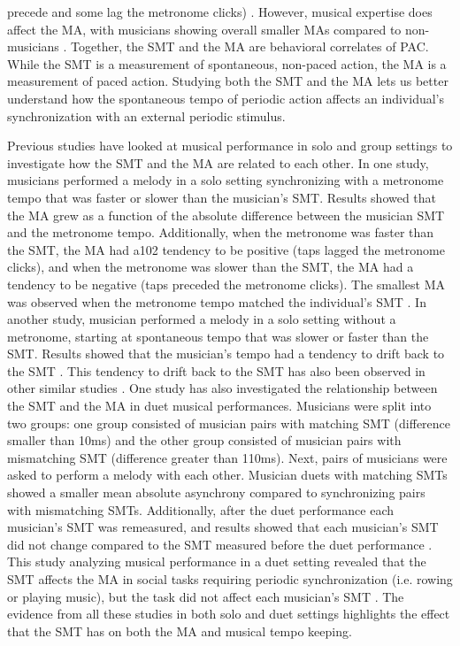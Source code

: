 \documentclass{report}
\begin{document}
precede and some lag the metronome clicks) \cite{baaaath2016estimating}. However, musical expertise does affect the MA, with musicians showing overall smaller MAs compared to non-musicians \cite{repp2007tapping}. Together, the SMT and the MA are behavioral correlates of PAC. While the SMT is a measurement of spontaneous, non-paced action, the MA is a measurement of paced action. Studying both the SMT and the MA lets us better understand how the spontaneous tempo of periodic action affects an individual’s synchronization with an external periodic stimulus.

Previous studies have looked at musical performance in solo and group settings to investigate how the SMT and the MA are related to each other. In one study, musicians performed a melody in a solo setting synchronizing with a metronome tempo that was faster or slower than the musician’s SMT. Results showed that the MA grew as a function of the absolute difference between the musician SMT and the metronome tempo. Additionally, when the metronome was faster than the SMT, the MA had a102 tendency to be positive (taps lagged the metronome clicks), and when the metronome was slower than the SMT, the MA had a tendency to be negative (taps preceded the metronome clicks). The smallest MA was observed when the metronome tempo matched the individual’s SMT \cite{scheurich2018tapping}. In another study, musician performed a melody in a solo setting without a metronome, starting at spontaneous tempo that was slower or faster than the SMT. Results showed that the musician’s tempo had a tendency to drift back to the SMT \cite{zamm2018musicians}. This tendency to drift back to the SMT has also been observed in other similar studies \cite{mcauley2006time, yu2003task}. One study has also investigated the relationship between the SMT and the MA in duet musical performances. Musicians were split into two groups: one group consisted of musician pairs with matching SMT (difference smaller than 10ms) and the other group consisted of musician pairs with mismatching SMT (difference greater than 110ms). Next, pairs of musicians were asked to perform a melody with each other. Musician duets with matching SMTs showed a smaller mean absolute asynchrony compared to synchronizing pairs with mismatching SMTs. Additionally, after the duet performance each musician’s SMT was remeasured, and results showed that each musician’s SMT did not change compared to the SMT measured before the duet performance \cite{zamm2016endogenous}. This study analyzing musical performance in a duet setting revealed that the SMT affects the MA in social tasks requiring periodic synchronization (i.e. rowing or playing music), but the task did not affect each musician’s SMT \cite{zamm2016endogenous}. The evidence from all these studies in both solo and duet settings highlights the effect that the SMT has on both the MA and musical tempo keeping.
\end{document}
